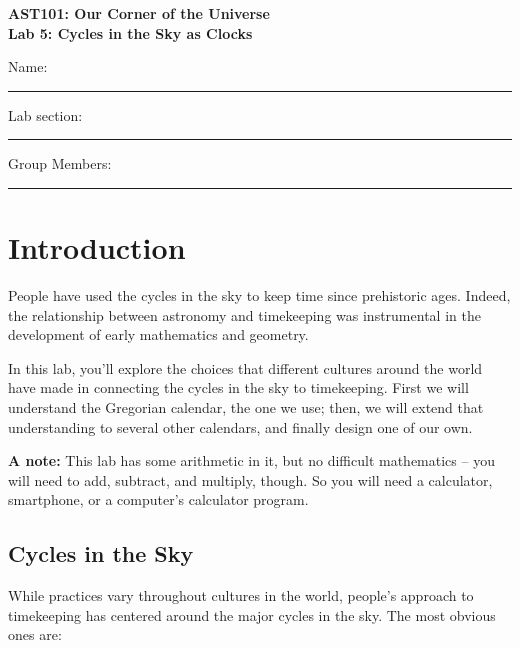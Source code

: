 \documentclass[11pt]{article}
\begin{document}
\begin{center}
\textbf{\Large
AST101: Our Corner of the Universe \\
\vspace*{0.1cm}
Lab 5: Cycles in the Sky as Clocks
}
\end{center}

\vspace*{0.5cm}

{\Large Name:}\vspace*{0.5cm}\\\hrule
{\Large Lab section:}\vspace*{0.5cm}\\\hrule
{\Large Group Members:}\vspace*{0.5cm}\\\hrule
\vspace*{0.5cm}
\section{Introduction}

People have used the cycles in the sky to keep time since prehistoric ages. Indeed, the relationship between astronomy and timekeeping was instrumental in the development of early mathematics and geometry.

In this lab, you'll explore the choices that different cultures around the world have made in connecting the cycles in the sky to timekeeping. First we will understand the Gregorian calendar, the one we use; then, we will extend that understanding to several other calendars, and finally design one of our own.

{\bf A note:} This lab has some arithmetic in it, but no difficult mathematics -- you will need to add, subtract, and multiply, though. So you will need a calculator, smartphone, or a computer's calculator program.

\subsection{Cycles in the Sky}

While practices vary throughout cultures in the world, people's approach to timekeeping has centered around the major cycles in the sky. The most obvious ones are:
\end{document}
